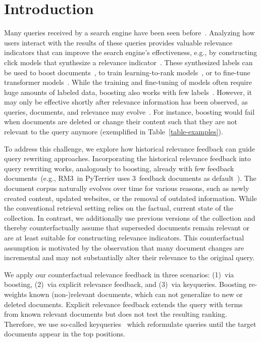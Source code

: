 \section{Introduction}

Many queries received by a search engine have been seen before~\cite{DBLP:journals/sigir/SilversteinHMM99}. Analyzing how users interact with the results of these queries provides valuable relevance indicators that can improve the search engine's effectiveness, e.g., by constructing click models that synthesize a relevance indicator~\cite{chuklin:2015}. These synthesized labels can be used to boost documents~\cite{keller:2024b}, to train learning-to-rank models~\cite{liu:2011}, or to fine-tune transformer models~\cite{lin:2021}. While the training and fine-tuning of models often require huge amounts of labeled data, boosting also works with few labels~\cite{keller:2024b}. However, it may only be effective shortly after relevance information has been observed, as queries, documents, and relevance may evolve~\cite{keller:2024}. For instance, boosting would fail when documents are deleted or change their content such that they are not relevant to the query anymore (exemplified in Table~\ref{table-examples}).



To address this challenge, we explore how historical relevance feedback can guide query rewriting approaches. Incorporating the historical relevance feedback into query rewriting works, analogously to boosting, already with few feedback documents~(e.g., RM3~in PyTerrier uses 3~feedback documents as default~\cite{macdonald:2020}). The document corpus naturally evolves over time for various reasons, such as newly created content, updated websites, or the removal of outdated information. While the conventional retrieval setting relies on the factual, current state of the collection. In contrast, we additionally use previous versions of the collection and thereby counterfactually assume that superseded documents remain relevant or are at least suitable for constructing relevance indicators. This counterfactual assumption is motivated by the observation that many document changes are incremental and may not substantially alter their relevance to the original query.

We apply our counterfactual relevance feedback in three scenarios: (1)~via boosting, (2)~via explicit relevance feedback, and (3)~via keyqueries. Boosting re-weights known (non-)relevant documents, which can not generalize to new or deleted documents. Explicit relevance feedback extends the query with terms from known relevant documents but does not test the resulting ranking. Therefore, we use so-called keyqueries~\cite{gollub:2013a} which reformulate queries until the target documents appear in the top positions.

